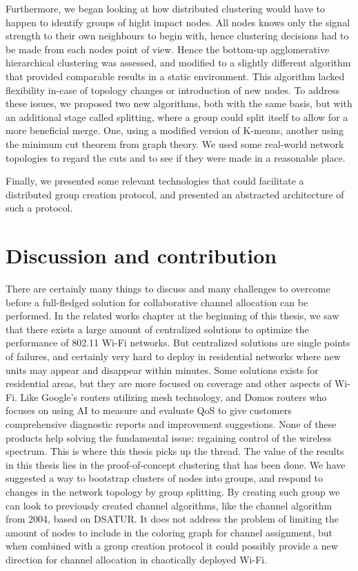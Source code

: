 Furthermore, we began looking at how distributed clustering would have to happen to identify groups of hight impact nodes.
All nodes knows only the signal strength to their own neighbours to begin with, hence clustering decisions had to be made from each nodes point of view. Hence the bottom-up agglomerative 
hierarchical clustering was assessed, and modified to a slightly different algorithm that provided comparable results in a static environment. This algorithm lacked flexibility in-case of
topology changes or introduction of new nodes. To address these issues, we proposed two new algorithms, both with the same basis, but with an additional stage called splitting, where a group could split itself to allow for a more beneficial merge. One, using a modified version of K-means, another using the minimum cut theorem from graph theory. We used some real-world network topologies
to regard the cuts and to see if they were made in a reasonable place.  

Finally, we presented some relevant technologies that could facilitate a distributed group creation protocol, and presented an abstracted architecture of such a protocol.

\section{Discussion and contribution}
There are certainly many things to discuss and many challenges to overcome before a full-fledged solution for collaborative channel allocation can be performed.
In the related works chapter at the beginning of this thesis, we saw that there exists a large amount of centralized solutions
to optimize the performance of 802.11 Wi-Fi networks. But centralized solutions are single points of failures, and certainly very hard to deploy in residential networks where new
units may appear and disappear within minutes. Some solutions exists for residential areas, but they are more focused on coverage and other aspects of Wi-Fi. Like 
Google's routers utilizing mesh technology, and Domos routers who focuses on using AI to measure and evaluate QoS to give customers comprehensive diagnostic reports and improvement suggestions. 
None of these products help solving the fundamental issue: regaining control of the wireless spectrum. This is where this thesis picks up the thread. The value of the results in this
thesis lies in the proof-of-concept clustering that has been done. We have suggested a way to bootstrap clusters of nodes into groups, and respond to changes in the network topology
by group splitting. By creating such group we can look to previously created channel algorithms, like the channel algorithm from 2004, based on DSATUR. It does not address the
problem of limiting the amount of nodes to include in the coloring graph for channel assignment, but when combined with a group creation protocol it could possibly provide a new direction for
channel allocation in chaotically deployed Wi-Fi.  

